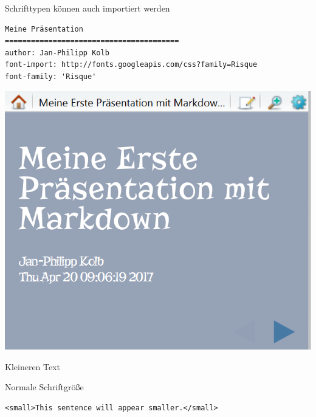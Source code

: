 \documentclass[ignorenonframetext,]{beamer}
\begin{document}
\begin{frame}[fragile]{Schrifttypen können auch importiert werden}

\begin{verbatim}
Meine Präsentation
========================================
author: Jan-Philipp Kolb
font-import: http://fonts.googleapis.com/css?family=Risque
font-family: 'Risque'
\end{verbatim}

\includegraphics{./tex2pdf.956/5cb5d1b51d9b032cb5ac1eaeead209d94ee014d2.png}

\end{frame}

\begin{frame}[fragile]{Kleineren Text}

Normale Schriftgröße

\begin{verbatim}
<small>This sentence will appear smaller.</small>
\end{verbatim}

\end{frame}
\end{document}

